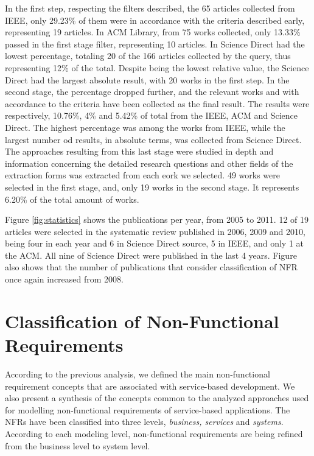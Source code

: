 \documentclass{sig-alternate}
\begin{document}
In the first step, respecting the filters described, the 65 articles collected
from IEEE, only 29.23\% of them were in accordance with the criteria
described early, representing 19 articles. In ACM Library, from 75 works
collected, only 13.33\% passed in the first stage filter, representing 10 articles. In Science Direct
had the lowest percentage, totaling 20 of the 166 articles collected by the
query, thus representing 12\% of the total. Despite being the lowest relative
value, the Science Direct had the largest absolute result, with 20 works
in the first step. In the second stage, the percentage dropped further, and the
relevant works and with accordance to the criteria have been collected as the
final result. The results were respectively, 10.76\%, 4\% and 5.42\% of total
from the IEEE, ACM and Science Direct. The highest percentage was among the
 works from  IEEE, while the largest number od results, in absolute terms,
 was collected from Science Direct. The approaches resulting from this last
 stage were studied in depth and information concerning the detailed research
 questions and other fields of the extraction forms was extracted from each
 eork we selected. 49 works were selected in the first stage, and, only 19
 works in the second stage. It represents  6.20\% of the total amount of works.


Figure \ref{fig:statistics} shows the publications per year, from
2005 to 2011. 12 of 19 articles were selected in the systematic review published
in 2006, 2009 and 2010, being four in each year and 6 in Science Direct source,
5 in IEEE, and only 1 at the ACM. All nine of Science Direct were
published in the last 4 years. Figure also
shows that the number of publications that consider classification of NFR once
again increased from 2008.



\section{Classification of Non-Functional Requirements}
\label{sec:classification}

 
According to the previous analysis, we defined the main non-functional
requirement concepts that are associated with service-based development. We also
present a synthesis of the concepts common to the analyzed approaches used for
modelling non-functional requirements of service-based applications. The NFRs
have been classified into three levels, \textit{business, services} and
\textit{systems}. According to each modeling level, non-functional requirements
are being refined from the business level to system level.
\end{document}
